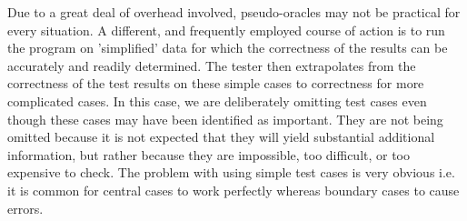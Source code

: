 Due to a great deal of overhead involved, pseudo-oracles may not be practical for every situation.  
A different, and frequently employed course of action is to run the program on 'simplified' data for which the correctness of the results can be accurately and readily determined. The tester then extrapolates from the correctness of the test results on these simple cases to correctness for more complicated cases. In this case, we are deliberately omitting test cases even though these cases may have been identified as important. They are not being omitted because it is not expected that they will yield substantial additional information, but rather because they are impossible, too difficult, or too expensive to check. The problem with using simple test cases is very obvious i.e. it is common for central cases to work perfectly whereas boundary cases to cause errors. \cite{Weyuker}

